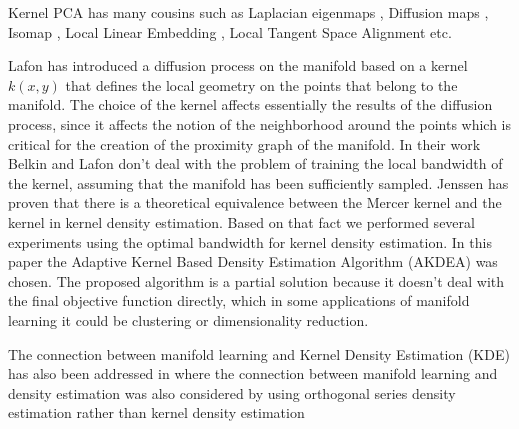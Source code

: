 \documentclass[12pt,letterpaper,doublespaced,ETD,dvips,proposal]{gtthesis}
\begin{document}
\begin{Body}
Kernel PCA has many cousins such as Laplacian eigenmaps
\cite{Belkin}, Diffusion maps  \cite{Lafon}, Isomap \cite{tenenbaum2000ggf},
Local Linear Embedding \cite{roweis1993ndr},
Local Tangent Space Alignment \cite{zhang2002pma} etc.

Lafon has introduced a diffusion process on the manifold based on a
kernel $k(x,y)$ that defines the local geometry on the points that
belong to the manifold. The choice of the kernel affects essentially
the results of the diffusion process, since it affects the notion of
the neighborhood around the points which is critical for the
creation of the proximity graph of the manifold. In their work
Belkin \cite{Belkin} and Lafon don't deal with the problem of training the local
bandwidth of the kernel, assuming that the manifold has been
sufficiently sampled. Jenssen \cite{jenssen17lpd} has proven  that
there is a theoretical equivalence between the Mercer kernel and the
kernel in kernel density estimation. Based on that fact we performed
several experiments using the optimal bandwidth for kernel density
estimation. In this paper the Adaptive Kernel Based Density
Estimation Algorithm (AKDEA) \cite{Silverman} was chosen. The
proposed algorithm is a partial solution because it doesn't deal
with the final objective function directly, which in some
applications of manifold learning it could be clustering or
dimensionality reduction.

The connection between manifold learning and Kernel Density Estimation (KDE) has also been addressed in \cite{girolami2002osd} where the connection between manifold
learning and density estimation was also considered by using
orthogonal series density estimation rather than kernel density
estimation



\end{Body}
\end{document}
